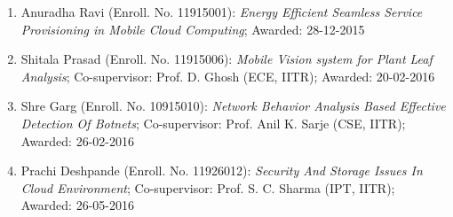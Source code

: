 \begin{enumerate}
		\item Anuradha Ravi (Enroll. No. 11915001): \textit{Energy Efficient Seamless Service Provisioning in Mobile Cloud Computing}; Awarded: 28-12-2015
		\item Shitala Prasad (Enroll. No. 11915006): \textit{Mobile Vision system for Plant Leaf Analysis}; Co-supervisor: Prof. D. Ghosh (ECE, IITR); Awarded: 20-02-2016
		\item Shre Garg (Enroll. No. 10915010): \textit{Network Behavior Analysis Based Effective Detection Of Botnets}; Co-supervisor: Prof. Anil K. Sarje (CSE, IITR); Awarded: 26-02-2016
		\item Prachi Deshpande (Enroll. No. 11926012): \textit{Security And Storage Issues In Cloud Environment}; Co-supervisor: Prof. S. C. Sharma (IPT, IITR); Awarded: 26-05-2016
			\end{enumerate}